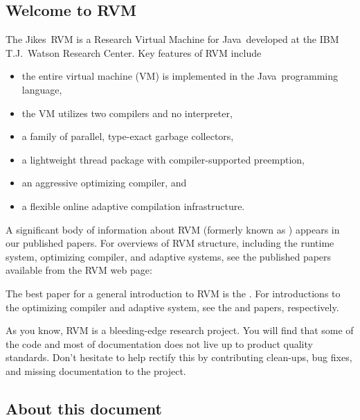 \subsection {Welcome to RVM}

The Jikes\trademark\ RVM is a Research Virtual Machine for Java\trademark\ developed at the IBM T.J.\ Watson Research Center.  Key features of RVM include 
\begin{itemize}
\item the entire virtual machine (VM) is implemented in the
  Java\trademark\  programming language,
\item the VM utilizes two compilers and no interpreter,
\item a family of parallel, type-exact garbage collectors,
\item a lightweight thread package with compiler-supported preemption,
\item an aggressive optimizing compiler, and 
\item a flexible online adaptive compilation infrastructure.
\end{itemize}

A significant body of information about RVM (formerly known as \jp) appears 
in our published
papers.  For overviews of RVM structure, including the runtime system,
optimizing compiler, and adaptive systems, see the published papers
available from the RVM web page:
\begin{quote}
\xlink{{\RVMHomeURL}}{\RVMHomeURL}
\end{quote}

The best paper for a general introduction to RVM is 
the 
.  
For introductions to the
optimizing compiler and adaptive system, see the 
{\JavaGrandePaperURL}
 and 
{\OOPSLAPaperURL}  
papers, respectively.

As you know, RVM is a bleeding-edge research project.  You will find that
some of the code and most of documentation does not live up to product  
quality standards. Don't hesitate to help rectify this by
contributing clean-ups, bug fixes, and missing documentation to 
the project.  
\subsection {About this document}

